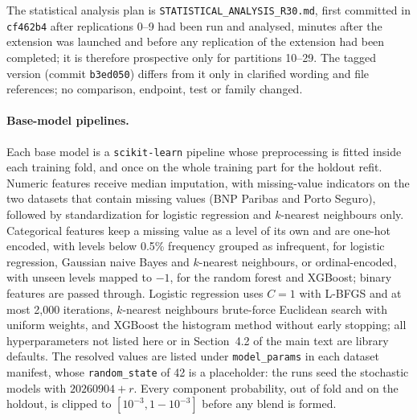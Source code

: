 \documentclass[11pt,a4paper]{article}
\begin{document}
The statistical analysis plan is \texttt{STATISTICAL\_ANALYSIS\_R30.md}, first committed in \texttt{cf462b4} after
replications 0--9 had been run and analysed, minutes after the extension was launched and before any replication of
the extension had been completed; it is therefore prospective only for partitions 10--29. The tagged version (commit
\texttt{b3ed050}) differs from it only in clarified wording and file references; no comparison, endpoint, test or
family changed.

\paragraph{Base-model pipelines.} Each base model is a \texttt{scikit-learn} pipeline whose preprocessing is fitted
inside each training fold, and once on the whole training part for the holdout refit. Numeric features receive median
imputation, with missing-value indicators on the two datasets that contain missing values (BNP Paribas and Porto
Seguro), followed by standardization for logistic regression and $k$-nearest neighbours only. Categorical features
keep a missing value as a level of its own and are one-hot encoded, with levels below 0.5\% frequency grouped as
infrequent, for logistic regression, Gaussian naive Bayes and $k$-nearest neighbours, or ordinal-encoded, with unseen
levels mapped to $-1$, for the random forest and XGBoost; binary features are passed through. Logistic regression
uses $C = 1$ with L-BFGS and at most 2{,}000 iterations, $k$-nearest neighbours brute-force Euclidean search with
uniform weights, and XGBoost the histogram method without early stopping; all hyperparameters not listed here or in
Section~4.2 of the main text are library defaults. The resolved values are listed under \texttt{model\_params} in each dataset manifest, whose
\texttt{random\_state} of 42 is a placeholder: the runs seed the stochastic models with $20260904 + r$. Every
component probability, out of fold and on the holdout, is clipped to $[10^{-3}, 1-10^{-3}]$ before any blend is
formed.
\end{document}
